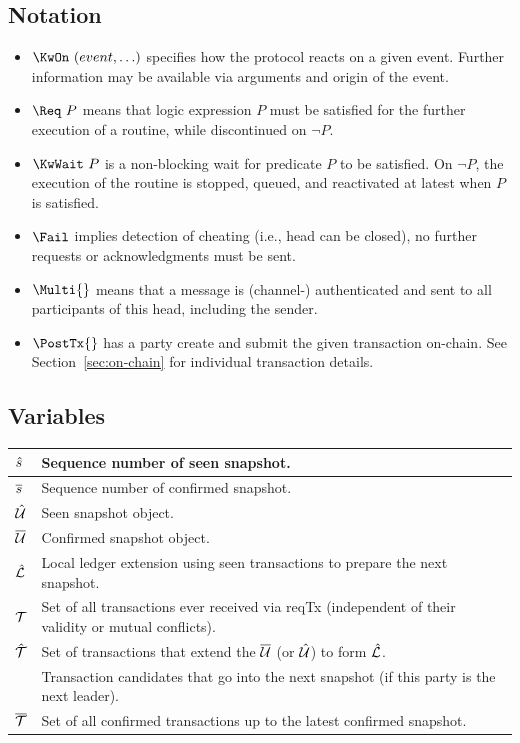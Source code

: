 \subsection{Notation}
\begin{itemize}
  \item $\KwOn~(event,\ldots)$ specifies how the protocol reacts on a given event. Further information may be available via arguments and origin of the event.
  \item $\Req~P$ means that logic expression $P$ must be satisfied for the further execution of
        a routine, while discontinued on $\neg P$.
  \item $\KwWait~P$ is a  non-blocking wait for
predicate $P$ to be satisfied. On $\neg P$, the execution of the
routine is stopped, queued, and reactivated at latest when $P$ is
satisfied.
  \item $\Fail$ implies detection of cheating (i.e., head can be closed), no
        further requests or acknowledgments must be sent.
  \item $\Multi{}$ means that a message is (channel-) authenticated and sent to all participants of this head, including the sender.
  \item $\PostTx{}$ has a party create and submit the given transaction on-chain. See Section~\ref{sec:on-chain} for individual transaction details.
\end{itemize}



\subsection{Variables}

\begin{center}
\begin{tabular}{|l|l|}\hline
  $\hat s$  & Sequence number of seen snapshot. \\ \hline
  $\overline s$  & Sequence number of confirmed snapshot. \\ \hline
  $\hat {\mathcal U}$ & Seen snapshot object. \\ \hline
  $\overline {\mathcal U}$ & Confirmed snapshot object. \\ \hline
  $\hat {\mathcal L}$ & Local ledger extension using seen transactions to prepare the next snapshot.\\ \hline
  ${\mathcal T}$    & Set of all transactions ever received via reqTx (independent of their validity or mutual conflicts).\\  \hline
  $\hat {\mathcal T}$ & Set of transactions that extend the $\overline {\mathcal U}$ (or $\hat {\mathcal U}$) to form $\hat {\mathcal L}$. \\
           & Transaction candidates that go into the next snapshot (if this party is the next leader).\\ \hline
  $\overline {\mathcal T}$ & Set of all confirmed transactions up to the latest confirmed snapshot.\\  \hline
\end{tabular}
\end{center}

